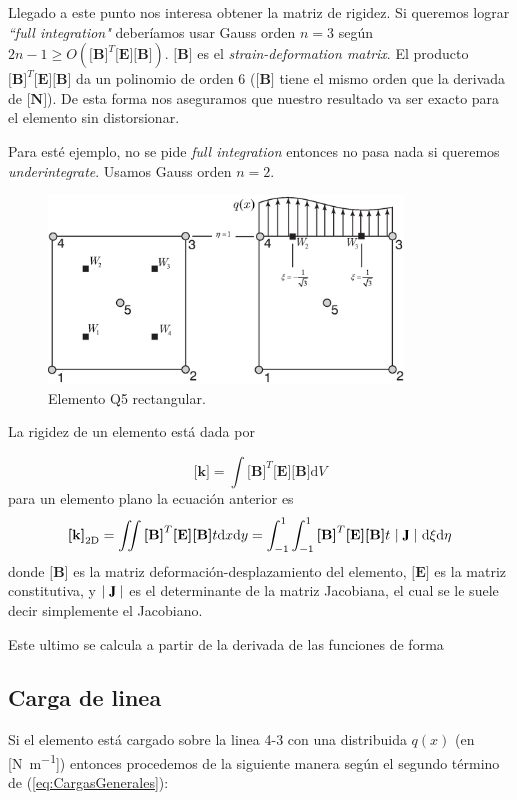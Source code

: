 \documentclass[11pt, a4paper,titlepage]{article}
\newcommand{\rmfontbf}[1]{{\fontfamily{ptm}\selectfont%
\textbf{#1}}}
\newcommand{\refp}[1]{(\ref{#1})}
\newcommand{\di}{\textrm{d}}
\newcommand{\jac}{\rmfontbf{J}}
\newcommand{\Djac}{|\;\jac\;|}
\newcommand{\Mme}[1]{\boldsymbol{[}\mathbf{#1} \boldsymbol{]}}
\newcommand{\MB}{\Mme{B}}
\newcommand{\MN}{\Mme{N}}
\newcommand{\ME}{\Mme{E}}
\newcommand{\Mk}{\Mme{k}}
\begin{document}
Llegado a este punto nos interesa obtener la matriz de rigidez. Si queremos lograr \emph{``full integration"} deberíamos usar Gauss orden $n=3$ según $2n-1\geq O\left(\MB^T \ME \MB \right)$. $\MB$ es el \textit{strain-deformation matrix}. El producto $\MB^T \ME \MB$ da un polinomio de orden 6 ($\MB$ tiene el mismo orden que la derivada de $\MN$). De esta forma nos aseguramos que nuestro resultado va ser exacto para el elemento sin distorsionar.

Para esté ejemplo, no se pide \emph{full integration} entonces no pasa nada si queremos \emph{underintegrate}. Usamos Gauss orden $n=2$. 

\begin{figure}[htb!]
    \centering
    \includegraphics[height=5cm]{fig/exoticElement.eps}
    \caption{Elemento Q5 rectangular.}
    \label{fig:elemq5}
\end{figure}

La rigidez de un elemento está dada por 


\begin{equation} \label{eq:RigidezElemento}
    \Mk=\int \MB^T \ME \MB \di V
\end{equation}
para un elemento plano la ecuación anterior es
\[
\Mk_{\mathrm{2D}}=\iint \MB^T \ME \MB t \di x \di y=\int^1_{-1}\int^1_{-1} \MB^T \ME \MB t \ \Djac \  \di\xi  \di\eta
\]
donde $\MB$ es la matriz deformación-desplazamiento del elemento, $\ME$ es la matriz constitutiva, y $\Djac$ es el determinante de la matriz Jacobiana, el cual se le suele decir simplemente el Jacobiano.

Este ultimo se calcula a partir de la derivada de las funciones de forma $ $

\subsection*{Carga de linea}
 Si el elemento está cargado sobre la linea 4-3 con una distribuida $q(x)$ (en [\si{\newton \per \meter}]) entonces procedemos de la siguiente manera según el segundo término de \refp{eq:CargasGenerales}: 
\end{document}
